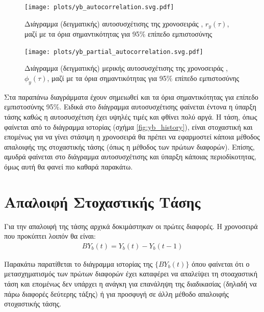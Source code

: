 \begin{figure}[H]
    \begin{center}
        \texttt{[image: plots/yb\_autocorrelation.svg.pdf]}
        \caption{Διάγραμμα (δειγματικής) αυτοσυσχέτισης της χρονοσειράς , $r_y(\tau)$, μαζί με τα όρια σημαντικότητας για 95\% επίπεδο εμπιστοσύνης}
        \label{fig:yb_autocorrelation}
    \end{center}
\end{figure}

\begin{figure}[H]
    \begin{center}
        \texttt{[image: plots/yb\_partial\_autocorrelation.svg.pdf]}
        \caption{Διάγραμμα (δειγματικής) μερικής αυτοσυσχέτισης της χρονοσειράς , $\phi_y(\tau)$, μαζί με τα όρια σημαντικότητας για 95\% επίπεδο εμπιστοσύνης}
        \label{fig:yb_partial_autocorrelation}
    \end{center}
\end{figure}

Στα παραπάνω διαγράμματα έχουν σημειωθεί και τα όρια σημαντικότητας για επίπεδο εμπιστοσύνης 95\%. Ειδικά στο διάγραμμα αυτοσυσχέτισης φαίνεται έντονα η ύπαρξη τάσης καθώς η αυτοσυσχέτιση έχει υψηλές τιμές και φθίνει πολύ αργά. Η τάση, όπως φαίνεται από το διάγραμμα ιστορίας (σχήμα \ref{fig:yb_history}), είναι στοχαστική και επομένως για να γίνει στάσιμη η χρονοσειρά θα πρέπει να εφαρμοστεί κάποια μέθοδος απαλοιφής της στοχαστικής τάσης (όπως η μέθοδος των πρώτων διαφορών). Επίσης, αμυδρά φαίνεται στο διάγραμμα αυτοσυσχέτισης και ύπαρξη κάποιας περιοδίκοτητας, όμως αυτή θα φανεί πιο καθαρά παρακάτω.

\section{Απαλοιφή Στοχαστικής Τάσης}

Για την απαλοιφή της τάσης αρχικά δοκιμάστηκαν οι πρώτες διαφορές. Η χρονοσειρά που προκύπτει λοιπόν θα είναι:
\begin{align}
    BY_b(t) = Y_b(t) - Y_b(t-1)
\end{align}

Παρακάτω παρατίθεται το διάγραμμα ιστορίας της $\{BY_b(t)\}$ όπου φαίνεται ότι ο μετασχηματισμός των πρώτων διαφορών έχει καταφέρει να απαλείψει τη στοαχαστική τάση και επομένως δεν υπάρχει η ανάγκη για επανάληψη της διαδικασίας (δηλαδή να πάρω διαφορές δεύτερης τάξης) ή για προσφυγή σε άλλη μέθοδο απαλοιφής στοχαστικής τάσης.

